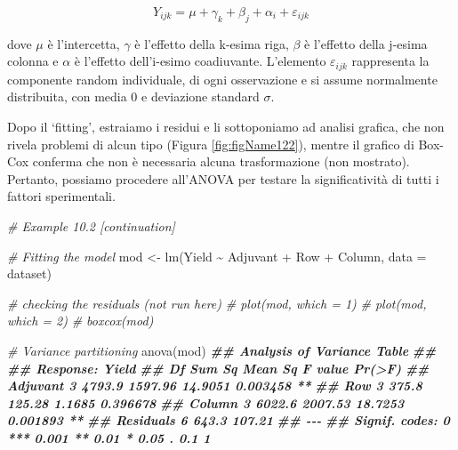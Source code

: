 \documentclass[
  12pt,
]{book}
\newenvironment{Shaded}{\begin{snugshade}}{\end{snugshade}}
\newcommand{\AttributeTok}[1]{\textcolor[rgb]{0.77,0.63,0.00}{#1}}
\newcommand{\CommentTok}[1]{\textcolor[rgb]{0.56,0.35,0.01}{\textit{#1}}}
\newcommand{\DocumentationTok}[1]{\textcolor[rgb]{0.56,0.35,0.01}{\textbf{\textit{#1}}}}
\newcommand{\FunctionTok}[1]{\textcolor[rgb]{0.00,0.00,0.00}{#1}}
\newcommand{\NormalTok}[1]{#1}
\newcommand{\OtherTok}[1]{\textcolor[rgb]{0.56,0.35,0.01}{#1}}
\newcommand{\SpecialCharTok}[1]{\textcolor[rgb]{0.00,0.00,0.00}{#1}}
\begin{document}
\[Y_{ijk} = \mu + \gamma_k + \beta_j + \alpha_i + \varepsilon_{ijk}\]

dove \(\mu\) è l'intercetta, \(\gamma\) è l'effetto della k-esima riga, \(\beta\) è l'effetto della j-esima colonna e \(\alpha\) è l'effetto dell'i-esimo coadiuvante. L'elemento \(\varepsilon_{ijk}\) rappresenta la componente random individuale, di ogni osservazione e si assume normalmente distribuita, con media 0 e deviazione standard \(\sigma\).

Dopo il `fitting', estraiamo i residui e li sottoponiamo ad analisi grafica, che non rivela problemi di alcun tipo (Figura \ref{fig:figName122}), mentre il grafico di Box-Cox conferma che non è necessaria alcuna trasformazione (non mostrato). Pertanto, possiamo procedere all'ANOVA per testare la significatività di tutti i fattori sperimentali.

\begin{Shaded}
\begin{Highlighting}[]
\CommentTok{\# Example 10.2 [continuation]}

\CommentTok{\# Fitting the model}
\NormalTok{mod }\OtherTok{\textless{}{-}} \FunctionTok{lm}\NormalTok{(Yield }\SpecialCharTok{\textasciitilde{}}\NormalTok{ Adjuvant }\SpecialCharTok{+}\NormalTok{ Row }\SpecialCharTok{+}\NormalTok{ Column, }\AttributeTok{data =}\NormalTok{ dataset)}

\CommentTok{\# checking the residuals (not run here)}
\CommentTok{\# plot(mod, which = 1)}
\CommentTok{\# plot(mod, which = 2)}
\CommentTok{\# boxcox(mod)}

\CommentTok{\# Variance partitioning}
\FunctionTok{anova}\NormalTok{(mod)}
\DocumentationTok{\#\# Analysis of Variance Table}
\DocumentationTok{\#\# }
\DocumentationTok{\#\# Response: Yield}
\DocumentationTok{\#\#           Df Sum Sq Mean Sq F value   Pr(\textgreater{}F)   }
\DocumentationTok{\#\# Adjuvant   3 4793.9 1597.96 14.9051 0.003458 **}
\DocumentationTok{\#\# Row        3  375.8  125.28  1.1685 0.396678   }
\DocumentationTok{\#\# Column     3 6022.6 2007.53 18.7253 0.001893 **}
\DocumentationTok{\#\# Residuals  6  643.3  107.21                    }
\DocumentationTok{\#\# {-}{-}{-}}
\DocumentationTok{\#\# Signif. codes:  0 \textquotesingle{}***\textquotesingle{} 0.001 \textquotesingle{}**\textquotesingle{} 0.01 \textquotesingle{}*\textquotesingle{} 0.05 \textquotesingle{}.\textquotesingle{} 0.1 \textquotesingle{} \textquotesingle{} 1}
\end{Highlighting}
\end{Shaded}
\end{document}
